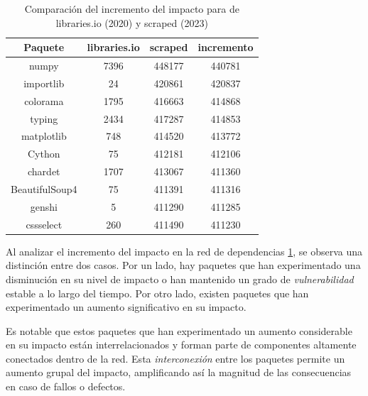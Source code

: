 \begin{table}[ht!]
    \centering
    \caption{Comparación del incremento del impacto para de libraries.io (2020) y scraped (2023)}
    \begin{tabular}{|c|c|c|c|}
        \hline
        \textbf{Paquete} & \textbf{libraries.io} & \textbf{scraped} & \textbf{incremento} \\
        \hline
        numpy            & 7396                  & 448177           & 440781              \\
        importlib        & 24                    & 420861           & 420837              \\
        colorama         & 1795                  & 416663           & 414868              \\
        typing           & 2434                  & 417287           & 414853              \\
        matplotlib       & 748                   & 414520           & 413772              \\
        Cython           & 75                    & 412181           & 412106              \\
        chardet          & 1707                  & 413067           & 411360              \\
        BeautifulSoup4   & 75                    & 411391           & 411316              \\
        genshi           & 5                     & 411290           & 411285              \\
        cssselect        & 260                   & 411490           & 411230              \\
        \hline
    \end{tabular}
    \label{tab:Comparación del incremento del impacto para de libraries.io (2020) y scraped (2023)}
\end{table}

Al analizar el incremento del impacto en la red de dependencias \ref{tab:Comparación del incremento del impacto para de libraries.io (2020) y scraped (2023)}, se observa una distinción entre
dos casos. Por un lado, hay paquetes que han experimentado una disminución en su nivel de impacto
o han mantenido un grado de \emph{vulnerabilidad} estable a lo largo del tiempo. Por otro lado,
existen paquetes que han experimentado un aumento significativo en su impacto.

Es notable que estos paquetes que han experimentado un aumento considerable en su impacto
están interrelacionados y forman parte de componentes altamente conectados dentro de la red.
Esta \emph{interconexión} entre los paquetes permite un aumento grupal del impacto, amplificando
así la magnitud de las consecuencias en caso de fallos o defectos.


